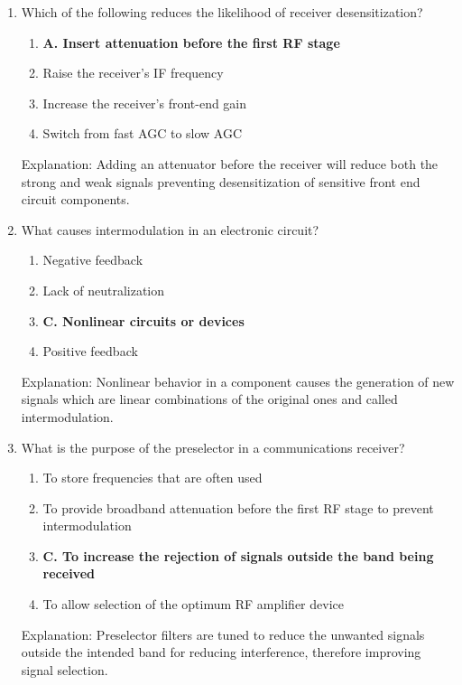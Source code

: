 \begin{enumerate}
   \item Which of the following reduces the likelihood of receiver desensitization?
        \begin{enumerate}
         \item \textbf{A. Insert attenuation before the first RF stage}
         \item  Raise the receiver's IF frequency
        \item  Increase the receiver's front-end gain
         \item  Switch from fast AGC to slow AGC
     \end{enumerate}
        \textcolor{myred}{Explanation:}
      Adding an attenuator before the receiver will reduce both the strong and weak signals preventing desensitization of sensitive front end circuit components.

    \item What causes intermodulation in an electronic circuit?
        \begin{enumerate}
     \item  Negative feedback
        \item  Lack of neutralization
       \item \textbf{C. Nonlinear circuits or devices}
        \item  Positive feedback
        \end{enumerate}
          \textcolor{myred}{Explanation:}
        Nonlinear behavior in a component causes the generation of new signals which are linear combinations of the original ones and called intermodulation.
        
    \item What is the purpose of the preselector in a communications receiver?
      \begin{enumerate}
      \item  To store frequencies that are often used
       \item  To provide broadband attenuation before the first RF stage to prevent intermodulation
      \item \textbf{C. To increase the rejection of signals outside the band being received}
       \item  To allow selection of the optimum RF amplifier device
        \end{enumerate}
        \textcolor{myred}{Explanation:}
          Preselector filters are tuned to reduce the unwanted signals outside the intended band for reducing interference, therefore improving signal selection.
   

\end{enumerate}
